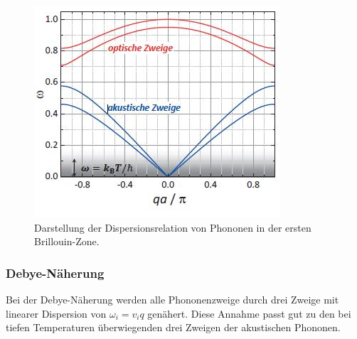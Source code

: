 \begin{figure}
  \centering
  \includegraphics{content/Phononen.jpg}
  \caption{Darstellung der Dispersionsrelation von Phononen in der ersten Brillouin-Zone. \cite{GrossMarx+2018}}
  \label{fig:aufbau}
\end{figure}

\subsubsection{Debye-Näherung}

Bei der Debye-Näherung werden alle Phononenzweige durch drei Zweige mit linearer Dispersion von $\omega_i=v_iq$ genähert. Diese Annahme passt gut zu den bei tiefen Temperaturen überwiegenden drei Zweigen der akustischen Phononen.

